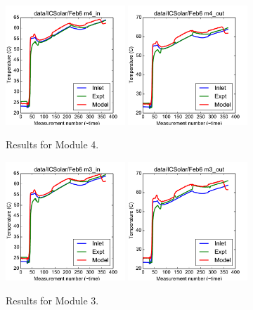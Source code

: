 \documentclass{article}
\begin{document}
\clearpage
\begin{figure}[!ht]
\centering
\includegraphics[width=0.4\textwidth]{../../data/ICSolar/images/Feb6_m4_in.pdf}\hspace{0.05\textwidth}
\includegraphics[width=0.4\textwidth]{../../data/ICSolar/images/Feb6_m4_out.pdf}\hspace{0.05\textwidth}\\
\caption{Results for Module 4.}\end{figure}
\begin{figure}[!ht]
\centering
\includegraphics[width=0.4\textwidth]{../../data/ICSolar/images/Feb6_m3_in.pdf}\hspace{0.05\textwidth}
\includegraphics[width=0.4\textwidth]{../../data/ICSolar/images/Feb6_m3_out.pdf}\hspace{0.05\textwidth}\\
\caption{Results for Module 3.}\end{figure}
\end{document}
